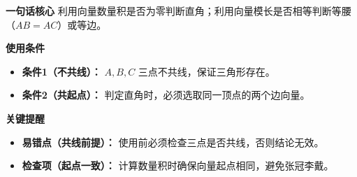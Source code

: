 \begin{summarybox}
	\textbf{\textcolor{CSummary}{一句话核心}}
	利用向量数量积是否为零判断直角；利用向量模长是否相等判断等腰（$AB=AC$）或等边。

	\medskip
	\textbf{\textcolor{CSummary}{使用条件}}
	\begin{itemize}[leftmargin=*, itemsep=0.5em, topsep=0.4em]
		\item \textbf{条件1（不共线）：} $A,B,C$ 三点不共线，保证三角形存在。
		\item \textbf{条件2（共起点）：} 判定直角时，必须选取同一顶点的两个边向量。
	\end{itemize}

	\medskip
	\textbf{\textcolor{CSummary}{关键提醒}}
	\begin{itemize}[leftmargin=*, itemsep=0.5em, topsep=0.4em]
		\item \textbf{易错点（共线前提）：} 使用前必须检查三点是否共线，否则结论无效。
		\item \textbf{检查项（起点一致）：} 计算数量积时确保向量起点相同，避免张冠李戴。
	\end{itemize}

\end{summarybox}

